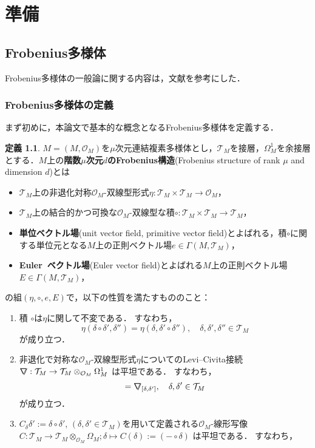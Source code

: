 \documentclass[a4paper,11pt]{jbook}
\theoremstyle{plain}
\theoremstyle{definition}
\newtheorem{defn}[thm]{定義}
\theoremstyle{remark}
\theoremstyle{proof}
\numberwithin{equation}{section}
\def\O{{\mathcal O}}
\def\T{{\mathcal T}}
\def\ns{{\nabla}\hspace{-1.4mm}\raisebox{0.3mm}{\text{\footnotesize{\bf /}}}}
\begin{document}
\chapter{準備}

\section{Frobenius多様体}
\label{section : Frobenius manifold}
Frobenius多様体の一般論に関する内容は，文献\cite{tak:2}を参考にした．
\subsection{Frobenius多様体の定義}
まず初めに，本論文で基本的な概念となるFrobenius多様体を定義する．
\begin{defn}
\label{definitionoffrobeniusmanifold}
$M=(M, \O_M)$を$\mu$次元連結複素多様体とし，$\T_M$を接層，$\Omega^1_M$を余接層とする．$M$上の{\bf 階数$\mu$次元$d$のFrobenius構造}(Frobenius structure of rank $\mu$ and dimension $d$)とは
\begin{itemize}
\item $\T_M$上の非退化対称$\O_M$-双線型形式$\eta :\T_M\times\T_M\to\O_M$，
\item $\T_M$上の結合的かつ可換な$\O_M$-双線型な積$\circ:\T_M\times\T_M\to\T_M$，
\item {\bf 単位ベクトル場}(unit vector field, primitive vector field)とよばれる，積$\circ$に関する単位元となる$M$上の正則ベクトル場$e\in\Gamma(M,\T_M)$，
\item {\bf Euler\ ベクトル場}(Euler vector field)とよばれる$M$上の正則ベクトル場$E\in\Gamma(M,\T_M)$，
\end{itemize}
の組$(\eta, \circ , e,E)$で，以下の性質を満たすもののこと：
\begin{enumerate}
\item 積 $\circ$は$\eta$に関して不変である． すなわち，
\begin{equation}
\eta(\delta\circ\delta',\delta'')=\eta(\delta,\delta'\circ\delta''),\quad
\delta,\delta',\delta''\in\T_M
\end{equation}
が成り立つ．
\item 非退化で対称な$\O_M$-双線型形式$\eta$についての{\rm Levi}--{\rm Civita}接続 $\ns:\T_M\to\T_M\otimes_{\O_M}\Omega_M^1$ は平坦である． すなわち，
\begin{equation}
[\ns_\delta,\ns_{\delta'}]=\ns_{[\delta,\delta']},\quad \delta,\delta'\in\T_M
\end{equation}
が成り立つ．
\item $C_\delta\delta':=\delta\circ\delta'$, $(\delta,\delta'\in\T_M)$を用いて定義される$\O_M$-線形写像$C:\T_M\to\T_M\otimes_{\O_M}\Omega_M ; \delta\mapsto C(\delta):=(-\circ \delta)$ は平坦である． すなわち，

\end{enumerate}
\end{defn}
\end{document}
